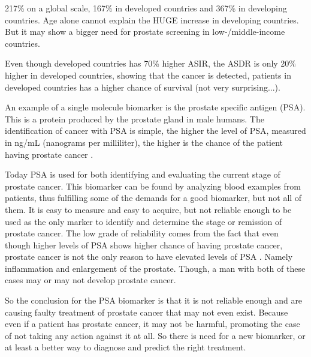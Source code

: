 \documentclass[UKenglish]{ifimaster}
\begin{document}
217\% on a global scale, 167\% in developed countries and 367\% in developing countries. Age alone cannot explain the
HUGE increase in developing countries.  But it may show a bigger need for prostate screening in low-/middle-income
countries.

Even though developed countries has 70\% higher ASIR, the ASDR is only 20\% higher in developed countries, showing that
the cancer is detected, patients in developed countries has a higher chance of survival (not very surprising...).

An example of a single molecule biomarker is the prostate specific antigen (PSA). This is a protein produced by the
prostate gland in male humans. The identification of cancer with PSA is simple, the higher the level of PSA, measured in
ng/mL (nanograms per milliliter), the higher is the chance of the patient having prostate cancer \cite{cancerfacts}.

Today PSA is used for both identifying and evaluating the current stage of prostate cancer. This biomarker can be found
by analyzing blood examples from patients, thus fulfilling some of the demands for a good biomarker, but not all of
them. It is easy to measure and easy to acquire, but not reliable enough to be used as the only marker to identify and
determine the stage or remission of prostate cancer. The low grade of reliability comes from the fact that even though
higher levels of PSA shows higher chance of having prostate cancer, prostate cancer is not the only reason to have
elevated levels of PSA \cite{cancerfacts}. Namely inflammation and enlargement of the prostate. Though, a man with both
of these cases may or may not develop prostate cancer.

So the conclusion for the PSA biomarker is that it is not reliable enough and are causing faulty treatment of prostate
cancer that may not even exist. Because even if a patient has prostate cancer, it may not be harmful, promoting the case
of not taking any action against it at all. So there is need for a new biomarker, or at least a better way to diagnose
and predict the right treatment.
\end{document}

